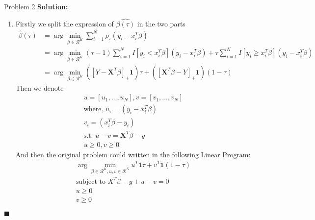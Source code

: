 \documentclass{article}
\newenvironment{solution}                               %
{\textbf{Solution:} }{$\blacksquare$}                   %
\newcommand{\domR}{\mathcal{R}}                         %
\renewcommand{\vec}[1]{\mathbf{#1}}                     %
\begin{document}
\begin{section}{Problem 2}
        \begin{solution}
            \begin{enumerate}[label=(\alph*)]
                \item %
                Firstly we split the expression of $\hat{\beta(\tau)}$ in the two parts
                \begin{align*}
                    \hat{\beta}(\tau) &= \arg\min_{\beta \in \domR^K} \sum_{i=1}^{N} \rho_\tau (y_i - x_i^T \beta) \\
                    &= \arg\min_{\beta \in \domR^K} (\tau-1)\sum_{i=1}^{N} I[y_i < x_i^T \beta] (y_i - x_i^T \beta) + \tau \sum_{i=1}^{N} I[y_i \geq x_i^T \beta] (y_i - x_i^T \beta) \\
                    &= \arg\min_{\beta \in \domR^K} ([Y - \vec{X}^T \beta]_+ \vec{1}) \tau + ([\vec{X}^T \beta - Y]_+ \vec{1}) (1-\tau)
                \end{align*}
                Then we denote
                \begin{gather*}
                    u = [u_1, \dots, u_N], v = [v_1, \dots, v_N] \\
                    \text{where, } u_i = (y_i - x_i^T \beta) \\
                    v_i = (x_i^T \beta - y_i) \\
                    \text{s.t. } u - v = \vec{X}^T \beta - y \\
                    u \geq 0, v \geq 0
                \end{gather*}
                And then the original problem could written in the following Linear Program:
                \begin{gather*}
                    \arg\min\limits_{\beta \in \domR^K, u,v \in \domR^N} u^T \vec{1} \tau + v^T \vec{1} (1- \tau) \\
                    \text{subject to } X^T \beta - y + u - v = 0 \\
                    u \geq 0 \\
                    v \geq 0
                \end{gather*}


\end{enumerate}
\end{solution}
\end{section}
\end{document}
